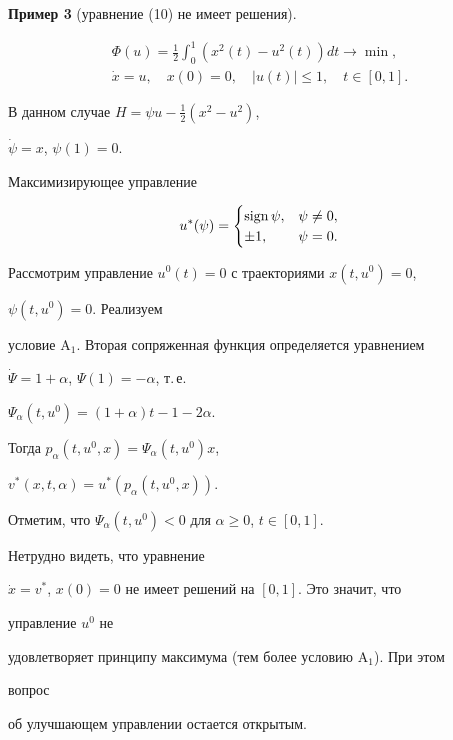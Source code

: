 {\bf Пример 3} (уравнение (10) не имеет решения). 


\begin{gather*} 


\Phi(u)=\frac{1}{2}\int^1_0(x^2(t)-u^2(t))dt\to\min,\\ 


\Dot x=u,\quad x(0)=0,\quad |u(t)|\le 1,\quad t\in[0,1]. 


\end{gather*} 


В данном случае $H=\psi u-\frac{1}{2}(x^2-u^2)$, 


$\Dot\psi=x$, $\psi(1)=0$. 


Максимизирующее управление 


$$ 


u^*(\psi)= 


\begin{cases} 


\sign\psi, & \psi\ne 0,\\ 


\pm 1, & \psi=0. 


\end{cases} 


$$ 


Рассмотрим управление $u^0(t)=0$ с траекториями $x(t,u^0)=0$, 


$\psi(t,u^0)=0$. Реализуем 


условие A${}_1$. Вторая сопряженная функция определяется уравнением 


$\Dot\Psi=1+\alpha$, $\Psi(1)=-\alpha$, т.\,е.{} 


$\Psi_\alpha(t,u^0)=(1+\alpha)t-1-2\alpha$. 


Тогда $p_\alpha(t,u^0,x)=\Psi_\alpha(t,u^0)x$, 


$v^*(x,t,\alpha)=u^*(p_\alpha(t,u^0,x))$. 


Отметим, что $\Psi_\alpha(t,u^0)<0$ для $\alpha\ge 0$, $t\in[0,1]$. 


Нетрудно видеть, что уравнение 


$\Dot x=v^*$, $x(0)=0$ не имеет решений на $[0,1]$. Это значит, что 


управление $u^0$ не 


удовлетворяет принципу максимума (тем более условию A${}_1$). При этом 


вопрос 


об улучшающем управлении остается открытым. 


 


